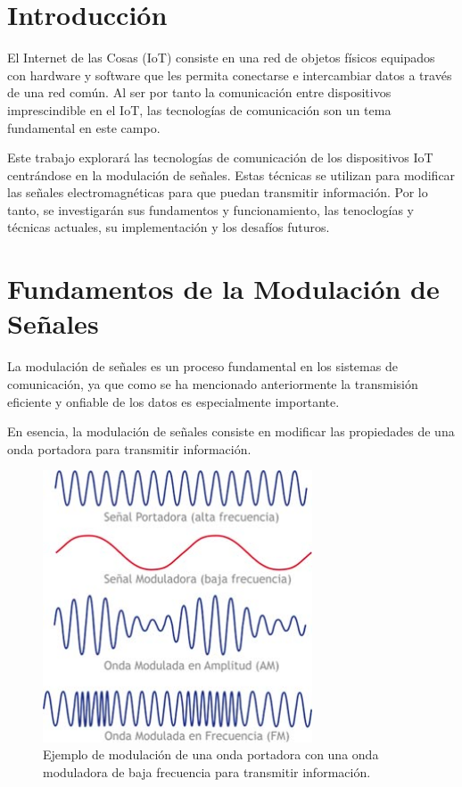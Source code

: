 \documentclass[12pt, letterpaper]{article}
\title{\doctitle}
\author{Juan Luis Serradilla Tormos}
\date{\monthname[\month] de \the\year}
\begin{document}
\pagestyle{fancy}

\maketitle

\newpage
\tableofcontents

\newpage
\section{Introducción}
El Internet de las Cosas (IoT) consiste en una red de objetos físicos equipados con hardware y software que les permita conectarse e intercambiar datos a través de una red común. Al ser por tanto la comunicación entre dispositivos imprescindible en el IoT, las tecnologías de comunicación son un tema fundamental en este campo.

Este trabajo explorará las tecnologías de comunicación de los dispositivos IoT centrándose en la modulación de señales. Estas técnicas se utilizan para modificar las señales electromagnéticas para que puedan transmitir información. Por lo tanto, se investigarán sus fundamentos y funcionamiento, las tenoclogías y técnicas actuales, su implementación y los desafíos futuros.


\vspace{1em}
\section{Fundamentos de la Modulación de Señales}

La modulación de señales es un proceso fundamental en los sistemas de comunicación, ya que como se ha mencionado anteriormente la transmisión eficiente y onfiable de los datos es especialmente importante.

En esencia, la modulación de señales consiste en modificar las propiedades de una onda portadora para transmitir información. 

\newpage
\begin{figure}[h]
    \centering
    \includegraphics[width=8cm]{images/modulacion_ejemplo.jpg}
    \caption{Ejemplo de modulación de una onda portadora con una onda moduladora de baja frecuencia para transmitir información.}
    \label{fig:modulacion_ejemplo}
\end{figure}
\end{document}
